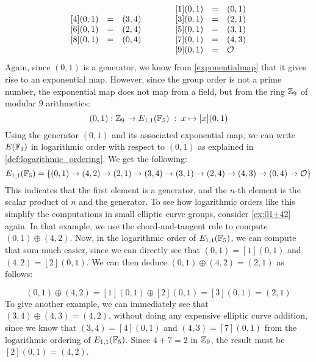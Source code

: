\begin{example}
\begin{equation}
\begin{array}{lccr}
\begin{array}{lcl}
{}[4](0,1) &=& (3, 4) \\ 
{}[6](0,1) &=& (2, 4) \\ 
{}[8](0,1) &=& (0, 4) \\ 
\end{array} & & &
{}\begin{array}{lcl}
{}[1](0,1) &=& (0, 1) \\
{}[3](0,1) &=& (2, 1) \\
{}[5](0,1) &=& (3, 1) \\
{}[7](0,1) &=& (4, 3) \\
{}[9](0,1) &=& \mathcal{O}
\end{array}
\end{array}
\end{equation}
Again, since $(0,1)$ is a generator, we know from \eqref{exponentialmap} that it gives rise to an exponential map. However, since the group order is not a prime number, the exponential map does not map from a field, but from the ring $\mathbb{Z}_9$ of modular $9$ arithmetics:
\begin{equation}
[\cdot](0,1): \Z_9 \to E_{1,1}(\F_5)\; : \; x\mapsto [x](0,1) 
\end{equation}
Using the generator $(0,1)$ and its associated exponential map, we can write $E(\mathbb{F}_1)$ in logarithmic order with respect to $(0,1)$ as explained in  \ref{def:logarithmic_ordering}. We get the following:
\begin{equation}
E_{1,1}(\mathbb{F}_5) = \{(0, 1)\to (4, 2)\to (2, 1)\to (3, 4)\to (3, 1)\to (2, 4)\to (4, 3)\to (0, 4)\to \mathcal{O} \}
\end{equation}
This indicates that the first element is a generator, and the $n$-th element is the scalar product of $n$ and the generator. To see how logarithmic orders like this simplify the computations in small elliptic curve groups, consider \examplename{} \ref{ex:01+42} again. In that example, we use the chord-and-tangent rule to compute $(0,1)\oplus (4,2)$. Now, in the logarithmic order of $E_{1,1}(\mathbb{F}_5)$, we can compute that sum much easier, since we can directly see that $(0,1)=[1](0,1)$ and $(4,2)=[2](0,1)$. We can then deduce $(0,1)\oplus (4,2)= (2,1)$ as follows:

\begin{equation}
(0,1)\oplus (4,2)=[1](0,1)\oplus [2](0,1)= [3](0,1)=(2,1)
\end{equation}
To give another example, we can immediately see that $(3,4)\oplus (4,3) = (4,2)$, without doing any expensive elliptic curve addition, since we know that $(3,4)= [4](0,1)$ and  $(4,3)= [7](0,1)$ from the logarithmic ordering of $E_{1,1}(\mathbb{F}_5)$. Since $4+7 = 2$ in $\mathbb{Z}_9$, the result must be $[2](0,1)=(4,2)$.


\end{example}
